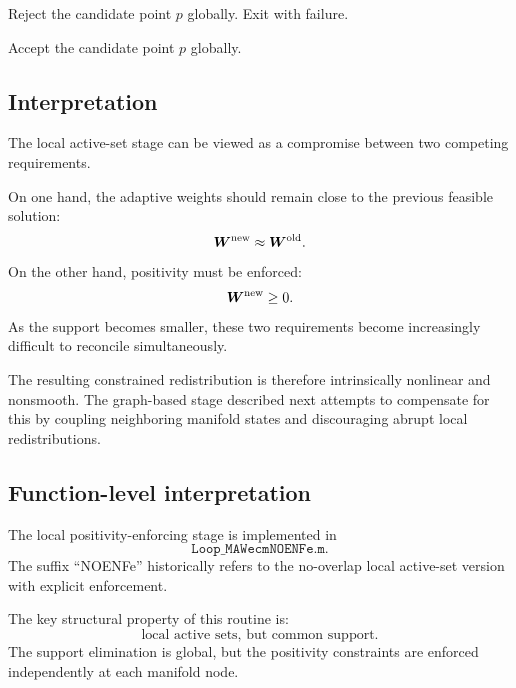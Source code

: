 \documentclass[11pt,a4paper]{article}
\begin{document}
\begin{algorithm}[H]
\begin{algorithmic}[1]
        \EndIf

    \EndWhile


        \State Reject the candidate point $p$ globally.
        \State Exit with failure.

    \EndIf

\EndFor

\State Accept the candidate point $p$ globally.

\end{algorithmic}
\end{algorithm}

\subsection{Interpretation}

The local active-set stage can be viewed as a compromise between two competing
requirements.

On one hand, the adaptive weights should remain close to the previous feasible
solution:
\[
        \bm W^{\mathrm{new}} \approx \bm W^{\mathrm{old}}.
\]
On the other hand, positivity must be enforced:
\[
        \bm W^{\mathrm{new}}\geq 0.
\]
As the support becomes smaller, these two requirements become increasingly
difficult to reconcile simultaneously.

The resulting constrained redistribution is therefore intrinsically nonlinear
and nonsmooth. The graph-based stage described next attempts to compensate for
this by coupling neighboring manifold states and discouraging abrupt local
redistributions.

\subsection{Function-level interpretation}

The local positivity-enforcing stage is implemented in
\[
        \texttt{Loop\_MAWecmNOENFe.m}.
\]
The suffix ``NOENFe'' historically refers to the no-overlap local active-set
version with explicit enforcement.

The key structural property of this routine is:
\[
        \text{local active sets, but common support}.
\]
The support elimination is global, but the positivity constraints are enforced
independently at each manifold node.
\end{document}
